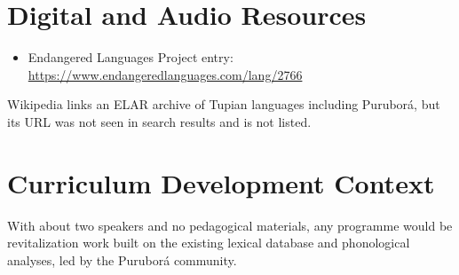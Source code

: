 \documentclass[12pt]{article}
\begin{document}
\section{Digital and Audio Resources}
\begin{itemize}
\item Endangered Languages Project entry: \url{https://www.endangeredlanguages.com/lang/2766}
\end{itemize}
Wikipedia links an ELAR archive of Tupian languages including Puruborá, but its URL was not seen in search results and is not listed.

\section{Curriculum Development Context}
With about two speakers and no pedagogical materials, any programme would be revitalization work built on the existing lexical database and phonological analyses, led by the Puruborá community.
\end{document}
